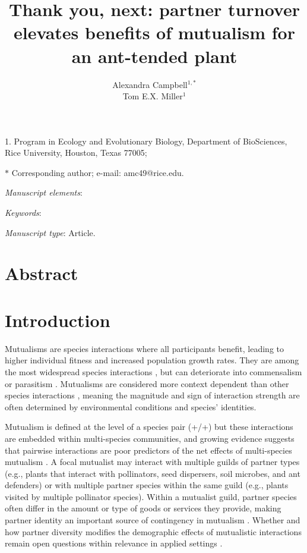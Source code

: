 \documentclass[11pt]{article}
\title{Thank you, next: partner turnover elevates benefits of mutualism for an ant-tended plant}
\author{Alexandra Campbell$^{1,\ast}$ \\ 
	Tom E.X. Miller$^{1}$}
\date{}
\begin{document}
	
	\maketitle
	
	\noindent{} 1. Program in Ecology and Evolutionary Biology, Department of BioSciences, Rice University, Houston, Texas 77005;
	
	\noindent{} $\ast$ Corresponding author; e-mail: amc49@rice.edu.
	
	
	\textit{Manuscript elements}: 
	
	\bigskip
	
	\textit{Keywords}: 
	
	\bigskip
	
	\textit{Manuscript type}: Article.
	
	\bigskip
	
	
\linenumbers{}
\modulolinenumbers[3]

\newpage{}

\section*{Abstract}


\newpage{}

\section*{Introduction}

Mutualisms are species interactions where all participants benefit, leading to higher individual fitness and increased population growth rates. 
They are among the most widespread species interactions \citep{Bronstein1994,Chamberlain2014,Frederickson2013}, but can deteriorate into commensalism or parasitism  \citep{Rodriguez-Rodriguez2017,Song2020,Mandyam2014,Thrall2007, Bahia2022}.
Mutualisms are considered more context dependent than other species interactions \citep{Chamberlain2014,Frederickson2013}, meaning the magnitude and sign of interaction strength are often determined by environmental conditions and species' identities.

Mutualism is defined at the level of a species pair (+/+) but these interactions are embedded within multi-species communities, and growing evidence suggests that pairwise interactions are poor predictors of the net effects of multi-species mutualism \citep{Afkhami2014,Palmer2010}. 
A focal mutualist may interact with multiple guilds of partner types (e.g., plants that interact with pollinators, seed dispersers, soil microbes, and ant defenders) or with multiple partner species within the same guild (e.g., plants visited by multiple pollinator species). 
Within a mutualist guild, partner species often differ in the amount or type of goods or services they provide, making partner identity an important source of contingency in mutualism \citep{Stanton2003}. 
Whether and how partner diversity modifies the demographic effects of mutualistic interactions remain open questions within relevance in applied settings \citep{rogers2014bee}. 
\end{document}
